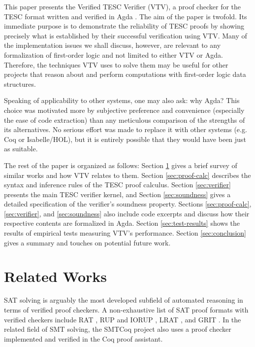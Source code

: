 \documentclass{lipics-v2021}
\begin{document}
This paper presents the Verified TESC Verifier (VTV), a proof checker for  
the TESC format written and verified in Agda \cite{bove2009brief}. 
The aim of the paper is twofold. Its immediate purpose is 
to demonstrate the reliability of TESC proofs by showing precisely what is established 
by their successful verification using VTV. Many of the implementation issues we shall 
discuss, however, are relevant to any formalization of first-order logic and not 
limited to either VTV or Agda. Therefore, the techniques VTV uses to solve them may be 
useful for other projects that reason about and perform computations with first-order 
logic data structures.

Speaking of applicability to other systems, one may also ask: why Agda? 
This choice was motivated more by subjective preference and convenience 
(especially the ease of code extraction) than any meticulous comparison of 
the strengths of its alternatives. No serious effort was made to replace it 
with other systems (e.g. Coq or Isabelle/HOL), but it is entirely possible 
that they would have been just as suitable. 

The rest of the paper is organized as follows:
Section \ref{sec:rel-works} gives a brief survey of similar works and how VTV relates to them.
Section \ref{sec:proof-calc} describes the syntax and inference rules of the TESC proof calculus.
Section \ref{sec:verifier} presents the main TESC verifier kernel, and
Section \ref{sec:soundness} gives a detailed specification of the verifier's soundness property.
Sections \ref{sec:proof-calc}, \ref{sec:verifier}, and \ref{sec:soundness} also include code 
excerpts and discuss how their respective contents are formalized in Agda.
Section \ref{sec:test-results} shows the  results of empirical tests measuring VTV's performance.
Section \ref{sec:conclusion} gives a summary and touches on potential future work.

\section{Related Works} \label{sec:rel-works}

SAT solving is arguably the most developed subfield of automated reasoning in terms of 
verified proof checkers. A non-exhaustive list of SAT proof formats with verified checkers
include RAT \cite{heule2013verifying}, RUP and IORUP \cite{heule2014bridging},
LRAT \cite{cruz2017lrat}, and GRIT \cite{cruz2017grit}. In the related field of SMT solving,
the SMTCoq project \cite{armand2011modular} also uses a proof checker implemented and
verified in the Coq proof assistant.
\end{document}
